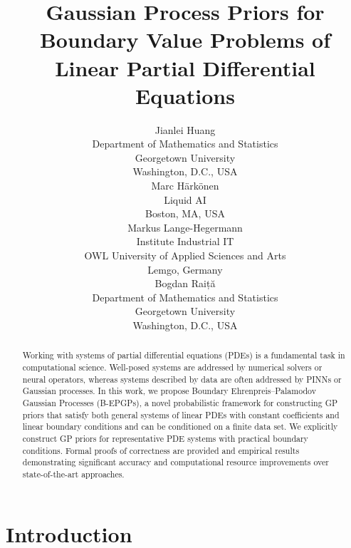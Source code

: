 \documentclass{article} %
\title{Gaussian Process Priors for \\Boundary Value Problems of \\Linear Partial Differential Equations}
\author{Jianlei Huang \\
Department of Mathematics and Statistics\\
Georgetown University\\
Washington, D.C., USA \\
\And
Marc Härkönen \\
Liquid AI \\
Boston, MA, USA \\
\AND
Markus Lange-Hegermann \\
Institute Industrial IT \\
OWL University of Applied Sciences and Arts\\
Lemgo, Germany \\
\And
Bogdan Raiță\\
Department of Mathematics and Statistics\\
Georgetown University\\
Washington, D.C., USA\\
}
\theoremstyle{plain}
\theoremstyle{definition}
\theoremstyle{remark}
\begin{document}
\maketitle

\begin{abstract}
  Working with systems of partial differential equations (PDEs) is a fundamental task in computational science.
  Well-posed systems are addressed by numerical solvers or neural operators, whereas systems described by data are often addressed by PINNs or Gaussian processes.
  In this work, we propose Boundary Ehrenpreis--Palamodov Gaussian Processes (B-EPGPs), a novel probabilistic framework for constructing GP priors that satisfy both general systems of linear PDEs with constant coefficients and linear boundary conditions and can be conditioned on a finite data set.
  We explicitly construct GP priors for representative PDE systems with practical boundary conditions.
  Formal proofs of correctness are provided and empirical results demonstrating significant accuracy and computational resource improvements over state-of-the-art approaches.
\end{abstract}



\section{Introduction}

\end{document}
